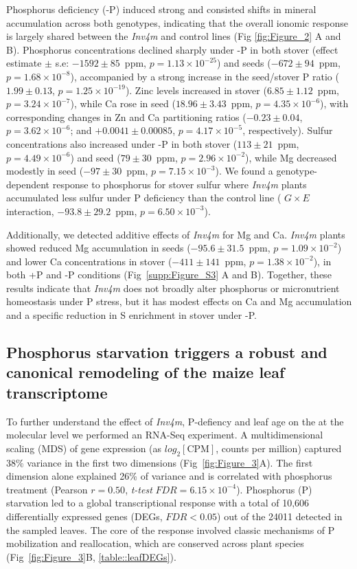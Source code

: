 \documentclass[9pt,twocolumn,twoside]{rilabRxiv}
\newcommand{\invfour}{\textit{Inv4m}\xspace}
\begin{document}
Phosphorus deficiency (-P) induced strong and consisted shifts in mineral accumulation across both genotypes, indicating that the overall ionomic response is largely shared between the \invfour and control lines (Fig \ref{fig:Figure_2} A and B). Phosphorus concentrations declined sharply under -P in both stover (effect estimate $\pm$ s.e: $-1592 \pm 85$~ppm, $p = 1.13 \times 10^{-25}$) and seeds ($-672 \pm 94$~ppm, $p = 1.68 \times 10^{-8}$), accompanied by a strong increase in the seed/stover P ratio ($1.99 \pm 0.13$, $p = 1.25 \times 10^{-19}$). Zinc levels increased in stover ($6.85 \pm 1.12$~ppm, $p = 3.24 \times 10^{-7}$), while Ca rose in seed ($18.96 \pm 3.43$~ppm, $p = 4.35 \times 10^{-6}$), with corresponding changes in Zn and Ca partitioning ratios ($-0.23 \pm 0.04$, $p = 3.62 \times 10^{-6}$; and $+0.0041 \pm 0.00085$, $p = 4.17 \times 10^{-5}$, respectively). Sulfur concentrations also increased under -P in both stover ($113 \pm 21$~ppm, $p = 4.49 \times 10^{-6}$) and seed ($79 \pm 30$~ppm, $p = 2.96 \times 10^{-2}$), while Mg decreased modestly in seed ($-97 \pm 30$~ppm, $p = 7.15 \times 10^{-3}$). 
We found a genotype-dependent response to phosphorus for stover sulfur where \invfour plants accumulated less sulfur under P deficiency than the control line ( $G \times E$  interaction,  $-93.8 \pm 29.2$~ppm, $p = 6.50 \times 10^{-3}$).

Additionally, we detected additive effects of \invfour for  Mg and Ca.  \invfour plants showed reduced Mg accumulation in seeds ($-95.6 \pm 31.5$~ppm, $p = 1.09 \times 10^{-2}$) and lower Ca concentrations in stover ($-411 \pm 141$~ppm, $p = 1.38 \times 10^{-2}$), in both +P and -P conditions (Fig~\ref{supp:Figure_S3} A and B).  Together, these results indicate that \invfour does not broadly alter phosphorus or micronutrient homeostasis under P stress, but it has modest effects on Ca and Mg accumulation and a specific reduction in S enrichment in stover under -P.

\subsection*{Phosphorus starvation triggers a robust and canonical remodeling of the maize leaf transcriptome}

To further understand the effect of \invfour, P-defiency and leaf age on the at the molecular level we performed an RNA-Seq experiment. 
A multidimensional scaling (MDS) of gene expression (as $log_2[\text{CPM}]$, counts per million) captured 38\% variance in the first two dimensions (Fig~\ref{fig:Figure_3}A).
The first dimension alone explained 26\% of variance and is correlated with phosphorus treatment (Pearson $r=0.50$, \textit{t-test} $\textit{FDR} = 6.15 \times 10^{-4}$).
Phosphorus (P) starvation led to a global transcriptional response with a total of 10,606 differentially expressed genes (DEGs, $\textit{FDR} < 0.05$) out of the 24011 detected in the sampled leaves.
The core of the response involved classic mechanisms of P mobilization and reallocation, which are conserved across plant species (Fig~\ref{fig:Figure_3}B, \ref{table::leafDEGs}).
\end{document}
